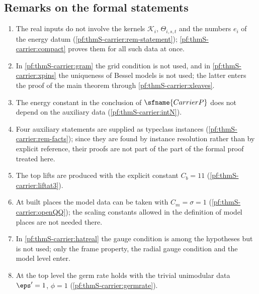 \subsection{Remarks on the formal statements}\label{sec:pf:thmS-carrier:remarks}
\begin{enumerate}
\item The real inputs do not involve the kernels $\mathcal K_i$, $\Theta_{i,s,t}$ and the numbers $e_i$ of the energy datum
  (\cref{pf:thmS-carrier:rem-statement}); \cref{pf:thmS-carrier:compact} proves them for all such data at once.
\item In \cref{pf:thmS-carrier:gram} the grid condition is not used, and in \cref{pf:thmS-carrier:xpins} the uniqueness of
  Bessel models is not used; the latter enters the proof of the main theorem through \cref{pf:thmS-carrier:xleaves}.
\item The energy constant in the conclusion of $\sfname{CarrierP}$ does not depend on the auxiliary data
  (\cref{pf:thmS-carrier:intN}).
\item Four auxiliary statements are supplied as typeclass instances (\cref{pf:thmS-carrier:rem-facts}); since they are found by
  instance resolution rather than by explicit reference, their proofs are not part of the part of the formal proof treated here.
\item The top lifts are produced with the explicit constant $C_b=11$ (\cref{pf:thmS-carrier:liftat3}).
\item At built places the model data can be taken with $C_m=\sigma=1$ (\cref{pf:thmS-carrier:openQQ}); the scaling constants
  allowed in the definition of model places are not needed there.
\item In \cref{pf:thmS-carrier:hatreal} the gauge condition is among the hypotheses but is not used; only the frame property, the
  radial gauge condition and the model level enter.
\item At the top level the germ rate holds with the trivial unimodular data $\eps'=1$, $\phi=1$
  (\cref{pf:thmS-carrier:germrate}).
\end{enumerate}

